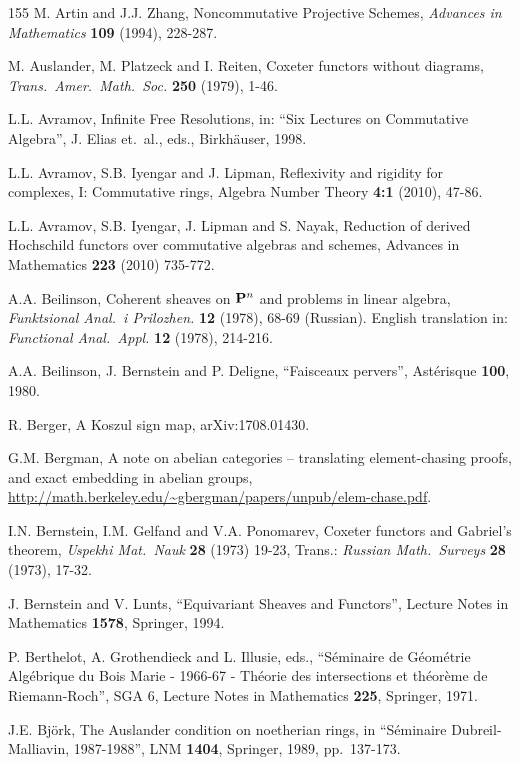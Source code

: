 \begin{thebibliography}{155}
 M. Artin and J.J. Zhang,
Noncommutative Projective Schemes, 
{\em Advances in Mathematics} {\bf 109} (1994), 228-287. 

 M. Auslander, M. Platzeck and I. Reiten,
Coxeter functors without diagrams,
{\em Trans.\ Amer.\ Math.\ Soc.} {\bf 250} (1979), 1-46.

 L.L. Avramov,
Infinite Free Resolutions, in:
``Six Lectures on Commutative Algebra'', J. Elias et.\ al., eds., 
Birkh\"auser, 1998. 

  L.L. Avramov, S.B. Iyengar and J. Lipman,
Reflexivity and rigidity for complexes, I: Commutative rings, 
Algebra Number Theory {\bf 4:1} (2010), 47-86. 

  L.L. Avramov, S.B. Iyengar, J. Lipman and S. Nayak,
Reduction of derived Hochschild functors over commutative algebras and schemes,
Advances in Mathematics {\bf 223} (2010) 735-772.

 A.A. Beilinson, 
Coherent sheaves on $\mathbf{P}^n$ and problems in linear algebra, 
{\em Funktsional Anal.\ i Prilozhen.} {\bf 12} (1978), 68-69 (Russian).
English translation in: {\em Functional Anal.\ Appl.} {\bf 12} (1978), 214-216.

 A.A. Beilinson, J. Bernstein and P. Deligne, 
``Faisceaux pervers'', Ast\'erisque {\bf 100}, 1980.

 R. Berger,
A Koszul sign map, arXiv:1708.01430.

 G.M. Bergman,
A note on abelian categories -- translating element-chasing
proofs, and exact embedding in abelian groups, 
\url{http://math.berkeley.edu/~gbergman/papers/unpub/elem-chase.pdf}.

 I.N. Bernstein, I.M. Gelfand and V.A. Ponomarev, 
Coxeter functors and Gabriel's theorem, 
{\em Uspekhi Mat.\ Nauk} {\bf 28} (1973) 19-23, 
Trans.: {\em Russian Math.\ Surveys} {\bf 28} (1973), 17-32.

 J. Bernstein and V. Lunts,
``Equivariant Sheaves and Functors'',
Lecture Notes in Mathematics {\bf 1578}, Springer, 1994. 

 P. Berthelot, A. Grothendieck and L. Illusie, eds., 
``S\'eminaire de G\'eom\'etrie Alg\'ebrique du Bois Marie - 1966-67 - 
Th\'eorie des intersections et th\'eor\`eme de Riemann-Roch'', SGA 6, 
Lecture Notes in Mathematics {\bf 225}, Springer, 1971.

 J.E. Bj\"ork, 
The Auslander condition on noetherian rings,
in ``S\'eminaire Dubreil-Malliavin, 1987-1988'', 
LNM {\bf 1404}, Springer, 1989, pp.\ 137-173.


\end{thebibliography}
